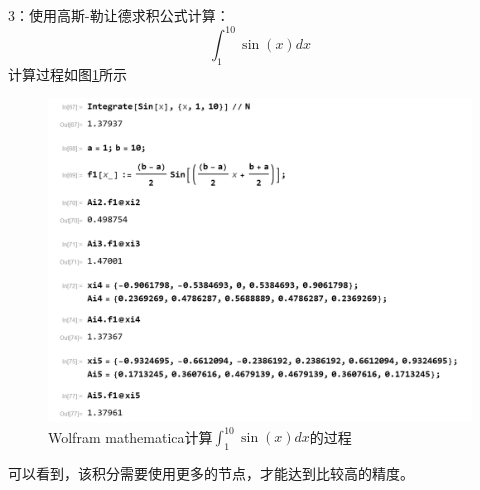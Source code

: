\documentclass{article}                          %
\numberwithin{equation}{subsection}              %
\begin{document}
3：使用高斯-勒让德求积公式计算：
\begin{equation}\label{key}
\int_{1}^{10}\sin(x) dx
\end{equation}
计算过程如图\ref{fig3}所示
\begin{figure}[h]
	\centering
	\includegraphics[width=\linewidth]{sinx1_10.png}
	\caption{Wolfram mathematica计算$\int_{1}^{10}\sin(x) dx $的过程}
	\label{fig3}
\end{figure}
可以看到，该积分需要使用更多的节点，才能达到比较高的精度。
\end{document}
